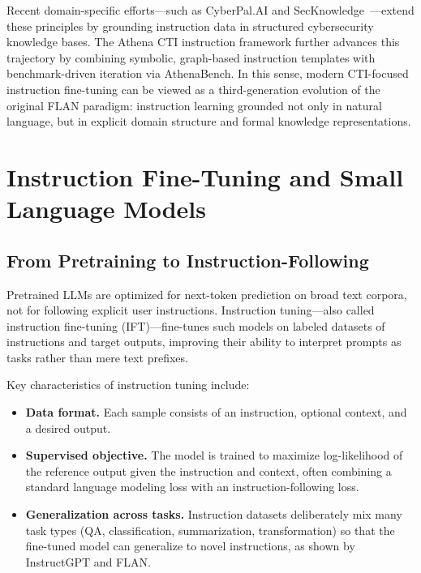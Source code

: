 \documentclass[10pt]{article}
\begin{document}
Recent domain-specific efforts—such as CyberPal.AI and SecKnowledge~\cite{levi2024cyberpal,levi2025toward}—extend these principles by grounding instruction data in structured cybersecurity knowledge bases. The Athena CTI instruction framework further advances this trajectory by combining symbolic, graph-based instruction templates with benchmark-driven iteration via AthenaBench. In this sense, modern CTI-focused instruction fine-tuning can be viewed as a third-generation evolution of the original FLAN paradigm: instruction learning grounded not only in natural language, but in explicit domain structure and formal knowledge representations.




\section{Instruction Fine-Tuning and Small Language Models}
\label{sec:ift-slm}

\subsection{From Pretraining to Instruction-Following}

Pretrained LLMs are optimized for next-token prediction on broad text corpora, not for following explicit user instructions. Instruction tuning---also called instruction fine-tuning (IFT)---fine-tunes such models on labeled datasets of instructions and target outputs, improving their ability to interpret prompts as tasks rather than mere text prefixes.\cite{wei2022flan,ouyang2022instructgpt}

Key characteristics of instruction tuning include:

\begin{itemize}[leftmargin=*]
  \item \textbf{Data format.} Each sample consists of an instruction, optional context, and a desired output.
  \item \textbf{Supervised objective.} The model is trained to maximize log-likelihood of the reference output given the instruction and context, often combining a standard language modeling loss with an instruction-following loss.
  \item \textbf{Generalization across tasks.} Instruction datasets deliberately mix many task types (QA, classification, summarization, transformation) so that the fine-tuned model can generalize to novel instructions, as shown by InstructGPT and FLAN.\cite{wei2022flan,ouyang2022instructgpt}
\end{itemize}
\end{document}
